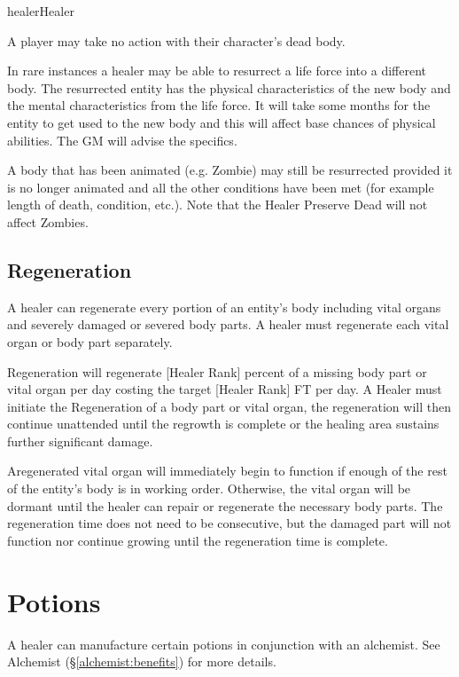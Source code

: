\begin{Skill}[1.4]{healer}{Healer}
\begin{Itemize}
\item A player may take no action with their character’s dead body.

\item In rare instances a healer may be able to resurrect a life force
  into a different body.  The resurrected entity has the physical
  characteristics of the new body and the mental characteristics from
  the life force. It will take some months for the entity to get used
  to the new body and this will affect base chances of physical
  abilities.  The GM will advise the specifics.

\item A body that has been animated (e.g.  Zombie) may still be
  resurrected provided it is no longer animated and all the other
  conditions have been met (for example length of death, condition,
  etc.).  Note that the Healer Preserve Dead will not affect Zombies.
\end{Itemize}

\subsection{Regeneration}

A healer can regenerate every portion of an entity’s body including
vital organs and severely damaged or severed body parts.  A healer
must regenerate each vital organ or body part separately.

Regeneration will regenerate [Healer Rank] percent of a missing body
part or vital organ per day costing the target [Healer Rank] FT per
day.  A Healer must initiate the Regeneration of a body part or vital
organ, the regeneration will then continue unattended until the
regrowth is complete or the healing area sustains further significant
damage.

Aregenerated vital organ will immediately begin to function if enough
of the rest of the entity’s body is in working order.  Otherwise, the
vital organ will be dormant until the healer can repair or regenerate
the necessary body parts. The regeneration time does not need to be
consecutive, but the damaged part will not function nor continue
growing until the regeneration time is complete.

\section{Potions}

A healer can manufacture certain potions in conjunction with an
alchemist.  See Alchemist (\S\ref{alchemist:benefits}) for more
details.


\end{Skill}
